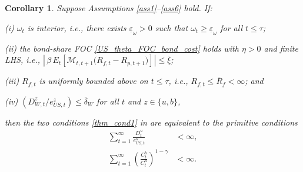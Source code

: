 \documentclass[12pt]{article}
\theoremstyle{plain}
\newtheorem{coro}{Corollary}
\begin{document}
\begin{coro}\label{coro1}
Suppose Assumptions \ref{ass1}--\ref{ass6} hold. If:

(i) $\omega_t$ is interior, i.e., there exists $\underline{\varepsilon}_\omega>0$ such that
$\omega_t\ge \underline{\varepsilon}_\omega$ for all $t\le\tau$;

(ii) the bond-share FOC \eqref{US_theta_FOC_bond_cost} holds with $\eta>0$ and finite LHS, i.e.,
$\left|\,\beta\,E_t\!\left[\mathcal M_{t,t+1}\bigl(R_{f,t}-R_{p,t+1}\bigr)\right]\right|\le \overline\xi$;

(iii) $R_{f,t}$ is uniformly bounded above on $t\le\tau$, i.e., $R_{f,t}\le \overline R_f<\infty$; and

(iv) $(D_{W,t}^z/e_{US,t}^z)\le \bar\delta_W$ for all $t$ and $z\in\{u,b\}$,

then the two conditions \eqref{thm_cond1} in  are equivalent to the primitive conditions
\begin{subequations}\label{thm_cond2}
\begin{align}
\sum_{t=1}^\infty \frac{D_t^u}{e_{US,t}^u}&<\infty, \label{thm_cond_2a}\\
\sum_{t=1}^\infty
\left(\frac{C_t^b}{C_t^u}\right)^{1-\gamma}&<\infty. \label{thm_cond_2b}
\end{align}
\end{subequations}
\end{coro}
\end{document}
